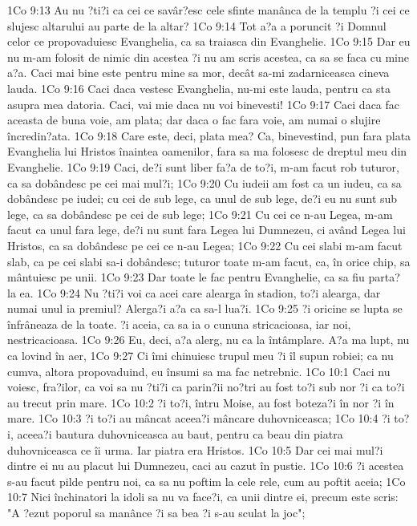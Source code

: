 1Co 9:13  Au nu ?ti?i ca cei ce savâr?esc cele sfinte manânca de la templu ?i cei ce slujesc altarului au parte de la altar?
1Co 9:14  Tot a?a a poruncit ?i Domnul celor ce propovaduiesc Evanghelia, ca sa traiasca din Evanghelie.
1Co 9:15  Dar eu nu m-am folosit de nimic din acestea ?i nu am scris acestea, ca sa se faca cu mine a?a. Caci mai bine este pentru mine sa mor, decât sa-mi zadarniceasca cineva lauda.
1Co 9:16  Caci daca vestesc Evanghelia, nu-mi este lauda, pentru ca sta asupra mea datoria. Caci, vai mie daca nu voi binevesti!
1Co 9:17  Caci daca fac aceasta de buna voie, am plata; dar daca o fac fara voie, am numai o slujire încredin?ata.
1Co 9:18  Care este, deci, plata mea? Ca, binevestind, pun fara plata Evanghelia lui Hristos înaintea oamenilor, fara sa ma folosesc de dreptul meu din Evanghelie.
1Co 9:19  Caci, de?i sunt liber fa?a de to?i, m-am facut rob tuturor, ca sa dobândesc pe cei mai mul?i;
1Co 9:20  Cu iudeii am fost ca un iudeu, ca sa dobândesc pe iudei; cu cei de sub lege, ca unul de sub lege, de?i eu nu sunt sub lege, ca sa dobândesc pe cei de sub lege;
1Co 9:21  Cu cei ce n-au Legea, m-am facut ca unul fara lege, de?i nu sunt fara Legea lui Dumnezeu, ci având Legea lui Hristos, ca sa dobândesc pe cei ce n-au Legea;
1Co 9:22  Cu cei slabi m-am facut slab, ca pe cei slabi sa-i dobândesc; tuturor toate m-am facut, ca, în orice chip, sa mântuiesc pe unii.
1Co 9:23  Dar toate le fac pentru Evanghelie, ca sa fiu parta? la ea.
1Co 9:24  Nu ?ti?i voi ca acei care alearga în stadion, to?i alearga, dar numai unul ia premiul? Alerga?i a?a ca sa-l lua?i.
1Co 9:25  ?i oricine se lupta se înfrâneaza de la toate. ?i aceia, ca sa ia o cununa stricacioasa, iar noi, nestricacioasa.
1Co 9:26  Eu, deci, a?a alerg, nu ca la întâmplare. A?a ma lupt, nu ca lovind în aer,
1Co 9:27  Ci îmi chinuiesc trupul meu ?i îl supun robiei; ca nu cumva, altora propovaduind, eu însumi sa ma fac netrebnic.
1Co 10:1  Caci nu voiesc, fra?ilor, ca voi sa nu ?ti?i ca parin?ii no?tri au fost to?i sub nor ?i ca to?i au trecut prin mare.
1Co 10:2  ?i to?i, întru Moise, au fost boteza?i în nor ?i în mare.
1Co 10:3  ?i to?i au mâncat aceea?i mâncare duhovniceasca;
1Co 10:4  ?i to?i, aceea?i bautura duhovniceasca au baut, pentru ca beau din piatra duhovniceasca ce îi urma. Iar piatra era Hristos.
1Co 10:5  Dar cei mai mul?i dintre ei nu au placut lui Dumnezeu, caci au cazut în pustie.
1Co 10:6  ?i acestea s-au facut pilde pentru noi, ca sa nu poftim la cele rele, cum au poftit aceia;
1Co 10:7  Nici închinatori la idoli sa nu va face?i, ca unii dintre ei, precum este scris: "A ?ezut poporul sa manânce ?i sa bea ?i s-au sculat la joc";
